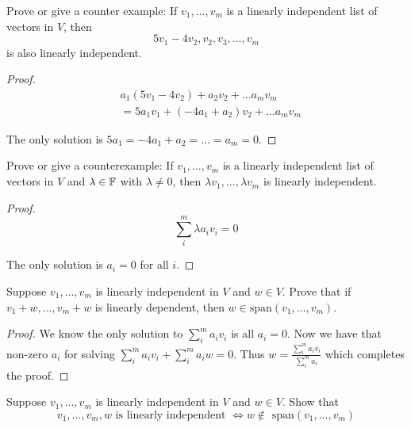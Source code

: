 \documentclass{extarticle}
\begin{document}
\begin{problem}{9}
    Prove or give a counter example: If \(v_1, \ldots, v_m\) is a linearly independent 
    list of vectors in \(V\), then 
    \[5v_1 - 4v_2, v_2, v_3, \ldots, v_m\]
    is also linearly independent.
\end{problem}

\begin{proof}
\begin{align*}
    &a_1 (5v_1 - 4v_2) + a_2 v_2 + \ldots a_m v_m \\ 
    &=5a_1 v_1 + (-4a_1  + a_2)v_2 + \ldots a_m v_m
\end{align*}

The only solution is \(5a_1 = -4a_1 + a_2 = \ldots = a_m = 0\).
\end{proof}

\begin{problem}{10}
    Prove or give a counterexample: If \(v_1, \ldots, v_m\) is a linearly 
    independent list of vectors in \(V\)  and \(\lambda \in \mathbb{F}\) with 
    \(\lambda \neq 0\), then \(\lambda v_1, \ldots, \lambda v_m\) is linearly 
    independent.
\end{problem}

\begin{proof}
\[\sum_{i}^m \lambda a_i v_i = 0\]

The only solution is \(a_i = 0\) for all \(i\).
\end{proof}

\begin{problem}{12}
    Suppose \(v_1, \ldots, v_m\) is linearly independent in \(V\) 
    and \(w \in V\). Prove that if \(v_1 + w, \ldots, v_m + w\) is 
    linearly dependent, then \(w \in \text{span}(v_1, \ldots, v_m)\).
\end{problem}

\begin{proof}
We know the only solution to \(\sum_i^m a_i v_i\) is all \(a_i = 0\). Now 
we have that non-zero \(a_i\) for solving \(\sum_i^m a_i v_i + \sum_i^m a_i w = 0\).
Thus \(w = \frac{\sum_i^m a_i v_i}{\sum_i^m a_i}\) which completes the proof.  
\end{proof}

\begin{problem}{13}
    Suppose \(v_1, \ldots, v_m\) is linearly independent in \(V\) and 
    \(w \in V\). Show that 
    \[v_1, \ldots, v_m, w \text{ is linearly independent } \Longleftrightarrow 
    w \notin \text{ span}(v_1, \ldots, v_m)\]
\end{problem}
\end{document}

